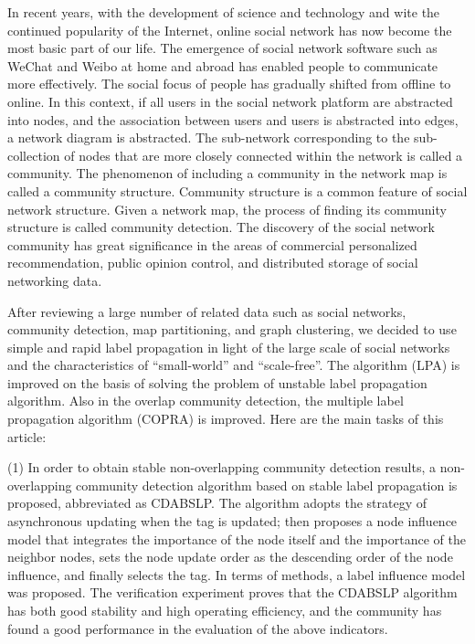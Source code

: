 \begin{englishabstract}

In recent years, with the development of science and technology and wite the continued popularity of the Internet, online social network has now become the most basic part of our life. The emergence of social network software such as WeChat and Weibo at home and abroad has enabled people to communicate more effectively. The social focus of people has gradually shifted from offline to online. In this context, if all users in the social network platform are abstracted into nodes, and the association between users and users is abstracted into edges, a network diagram is abstracted. The sub-network corresponding to the sub-collection of nodes that are more closely connected within the network is called a community. The phenomenon of including a community in the network map is called a community structure. Community structure is a common feature of social network structure. Given a network map, the process of finding its community structure is called community detection. The discovery of the social network community has great significance in the areas of commercial personalized recommendation, public opinion control, and distributed storage of social networking data.

After reviewing a large number of related data such as social networks, community detection, map partitioning, and graph clustering, we decided to use simple and rapid label propagation in light of the large scale of social networks and the characteristics of “small-world” and “scale-free”. The algorithm (LPA) is improved on the basis of solving the problem of unstable label propagation algorithm. Also in the overlap community detection, the multiple label propagation algorithm (COPRA) is improved. Here are the main tasks of this article:

(1) In order to obtain stable non-overlapping community detection results, a non-overlapping community detection algorithm based on stable label propagation is proposed, abbreviated as CDABSLP. The algorithm adopts the strategy of asynchronous updating when the tag is updated; then proposes a node influence model that integrates the importance of the node itself and the importance of the neighbor nodes, sets the node update order as the descending order of the node influence, and finally selects the tag. In terms of methods, a label influence model was proposed. The verification experiment proves that the CDABSLP algorithm has both good stability and high operating efficiency, and the community has found a good performance in the evaluation of the above indicators.


\end{englishabstract}
